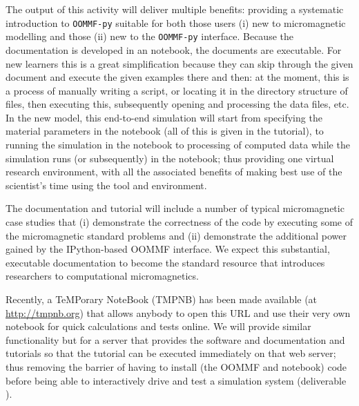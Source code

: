 \begin{workpackage}
\begin{tasklist}
\begin{task}[lead=USO,title=\OOMMFNB{} demonstrator: executable tutorial and
  documentation, id=oommf-tutorial-and-documentation, PM=7]
  The output of this activity will deliver multiple benefits:
  providing a systematic introduction to \texttt{OOMMF-py} suitable for both
  those users (i) new to micromagnetic modelling and those (ii) new to
  the \texttt{OOMMF-py} interface. Because the documentation is developed in an
  \Jupyter notebook, the documents are executable. For new learners
  this is a great simplification because they can skip through the
  given document and execute the given examples there and then: at the
  moment, this is a process of manually writing a script, or locating
  it in the directory structure of files, then executing this,
  subsequently opening and processing the data files, etc. In the new
  model, this end-to-end simulation will start from specifying the
  material parameters in the notebook (all of this is given in the
  tutorial), to running the simulation in the notebook to processing
  of computed data while the simulation runs (or subsequently) in the
  notebook; thus providing one virtual research environment, with all
  the associated benefits of making best use of the scientist's time
  using the tool and environment.

  The documentation and tutorial will include a number of typical
  micromagnetic case studies that (i) demonstrate the correctness of
  the code by executing some of the micromagnetic standard problems
  and (ii) demonstrate the additional power gained by the
  IPython-based OOMMF interface. We expect this substantial, executable
  documentation to become the standard resource that introduces
  researchers to computational micromagnetics.
\end{task}

\begin{task}[lead=USO,id=oommf-nb-ve,title=\OOMMFNB{} online and downloadable virtual environments,PM=3]
  Recently, a TeMPorary \Jupyter NoteBook (TMPNB) has been made available (at
  \href{http://tmpnb.org}{http://tmpnb.org}) that allows anybody to
  open this URL and use their very own \Jupyter notebook for quick
  calculations and tests online. We will provide similar functionality
  but for a server that provides the \OOMMFNB{} software and \OOMMFNB{}
  documentation and tutorials so that the tutorial can be executed
  immediately on that web server; thus removing the barrier of having
  to install (the OOMMF and \Jupyter notebook) code before being able to interactively drive and test a
  simulation system (deliverable ).


\end{task}
\end{tasklist}
\end{workpackage}
